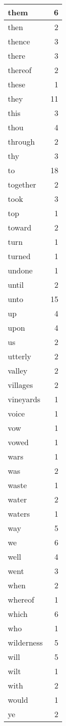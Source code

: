 \begin{center}
\begin{longtable}{l|r}
them & 6 \\ \hline
then & 2 \\ \hline
thence & 3 \\ \hline
there & 3 \\ \hline
thereof & 2 \\ \hline
these & 1 \\ \hline
they & 11 \\ \hline
this & 3 \\ \hline
thou & 4 \\ \hline
through & 2 \\ \hline
thy & 3 \\ \hline
to & 18 \\ \hline
together & 2 \\ \hline
took & 3 \\ \hline
top & 1 \\ \hline
toward & 2 \\ \hline
turn & 1 \\ \hline
turned & 1 \\ \hline
undone & 1 \\ \hline
until & 2 \\ \hline
unto & 15 \\ \hline
up & 4 \\ \hline
upon & 4 \\ \hline
us & 2 \\ \hline
utterly & 2 \\ \hline
valley & 2 \\ \hline
villages & 2 \\ \hline
vineyards & 1 \\ \hline
voice & 1 \\ \hline
vow & 1 \\ \hline
vowed & 1 \\ \hline
wars & 1 \\ \hline
was & 2 \\ \hline
waste & 1 \\ \hline
water & 2 \\ \hline
waters & 1 \\ \hline
way & 5 \\ \hline
we & 6 \\ \hline
well & 4 \\ \hline
went & 3 \\ \hline
when & 2 \\ \hline
whereof & 1 \\ \hline
which & 6 \\ \hline
who & 1 \\ \hline
wilderness & 5 \\ \hline
will & 5 \\ \hline
wilt & 1 \\ \hline
with & 2 \\ \hline
would & 1 \\ \hline
ye & 2 \\ \hline
\end{longtable}
\end{center}



